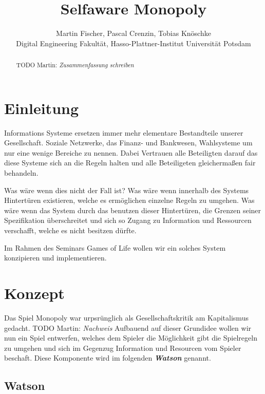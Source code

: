 \documentclass[german]{cgspaper} %
\title{Selfaware Monopoly}
\author{Martin Fischer, Pascal Crenzin, Tobias Knöschke\\ Digital Engineering Fakultät, Hasso-Plattner-Institut \textbar{} Universität Potsdam}
\newcommand{\todo}[1]{\textit{#1}}
\newcommand{\Martin}[1]{\textcolor{colorMartin}{TODO Martin:} \todo{#1} }
\newcommand{\neuerBegriff}[1]{\textbf{\textit{#1}}}
\begin{document}
\teaser{
}

\maketitle

\begin{abstract}
    \Martin{Zusammenfassung schreiben}
\end{abstract}

\copyrightspace %


\section{Einleitung}

Informations Systeme ersetzen immer mehr elementare Bestandteile unserer Gesellschaft.
Soziale Netzwerke, das Finanz- und Bankwesen, Wahlsysteme um nur eine wenige Bereiche zu nennen.
Dabei Vertrauen alle Beteiligten darauf das diese Systeme sich an die Regeln halten und alle Beteiligeten gleichermaßen fair behandeln.

Was wäre wenn dies nicht der Fall ist? 
Was wäre wenn innerhalb des Systems Hintertüren existieren, welche es ermöglichen einzelne Regeln zu umgehen.
Was wäre wenn das System durch das benutzen dieser Hintertüren, die Grenzen seiner Spezifikation überschreitet und sich so Zugang zu Information und Ressourcen verschafft, welche es nicht besitzen dürfte.

Im Rahmen des Seminars Games of Life wollen wir ein solches System konzipieren und implementieren.

\section{Konzept}

Das Spiel Monopoly war urpsrünglich als Gesellschaftskritik am Kapitalismus gedacht. \Martin{Nachweis} 
Aufbauend auf dieser Grundidee wollen wir nun ein Spiel entwerfen, welches dem Spieler die Möglichkeit gibt die Spielregeln zu umgehen und sich im Gegenzug Information und Resourcen vom Spieler beschaft. 
Diese Komponente wird im folgenden \neuerBegriff{Watson} genannt.

\subsection{Watson}
\end{document}
